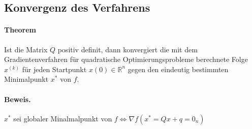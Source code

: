 \subsection{Konvergenz des Verfahrens}
\paragraph{Theorem}
Ist die Matrix $Q$ positiv definit, dann konvergiert die mit dem Gradientenverfahren für quadratische Optimierungsprobleme berechnete Folge {$x^{(k)}$} für jeden Startpunkt $x(0) \in \mathbb{R}^n$ gegen den eindeutig
bestimmten Minimalpunkt $x^{*}$ von $f$.
\paragraph{Beweis.}
$x^{*}$ sei globaler Minalmalpunkt von $f \Leftrightarrow \nabla f(x^{*}=Qx+q= 0_n) $
